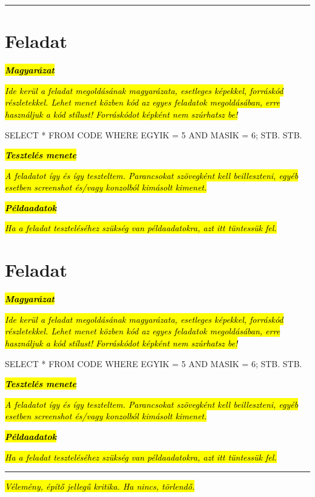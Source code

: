 \documentclass[12pt]{article}
\newcommand{\fillme}[1]{\emph{\hl{#1}}}
\begin{document}
\vspace{-0.5cm}
\hspace{-0.5cm}\rule{1.02\textwidth}{0.4pt}


\section{Feladat}

\textbf{\fillme{Magyarázat}}

\fillme{Ide kerül a feladat megoldásának magyarázata, esetleges képekkel, forráskód részletekkel. Lehet menet közben kód az egyes feladatok megoldásában, erre használjuk a kód stílust! Forráskódot képként nem szúrhatsz be!}
\begin{verbatimtab}
	SELECT *
	FROM CODE
	WHERE
	EGYIK = 5
	AND MASIK = 6;
	STB. STB.
\end{verbatimtab}


\textbf{\fillme{Tesztelés menete}}

\fillme{A feladatot így és így teszteltem. Parancsokat szövegként kell beilleszteni, egyéb esetben screenshot és/vagy konzolból kimásolt kimenet.}

\textbf{\fillme{Példaadatok}}

\fillme{Ha a feladat teszteléséhez szükség van példaadatokra, azt itt tüntessük fel.}



\newpage
\section{Feladat}


\textbf{\fillme{Magyarázat}}

\fillme{Ide kerül a feladat megoldásának magyarázata, esetleges képekkel, forráskód részletekkel. Lehet menet közben kód az egyes feladatok megoldásában, erre használjuk a kód stílust! Forráskódot képként nem szúrhatsz be!}
\begin{verbatimtab}
	SELECT *
	FROM CODE
	WHERE
	EGYIK = 5
	AND MASIK = 6;
	STB. STB.
\end{verbatimtab}


\textbf{\fillme{Tesztelés menete}}

\fillme{A feladatot így és így teszteltem. Parancsokat szövegként kell beilleszteni, egyéb esetben screenshot és/vagy konzolból kimásolt kimenet.}

\textbf{\fillme{Példaadatok}}

\fillme{Ha a feladat teszteléséhez szükség van példaadatokra, azt itt tüntessük fel.}


\newpage
\vspace{24pt}

\vspace{-0.5cm}
\hspace{-0.5cm}\rule{\textwidth}{0.4pt}

\fillme{Vélemény, építő jellegű kritika. Ha nincs, törlendő.}
\end{document}

